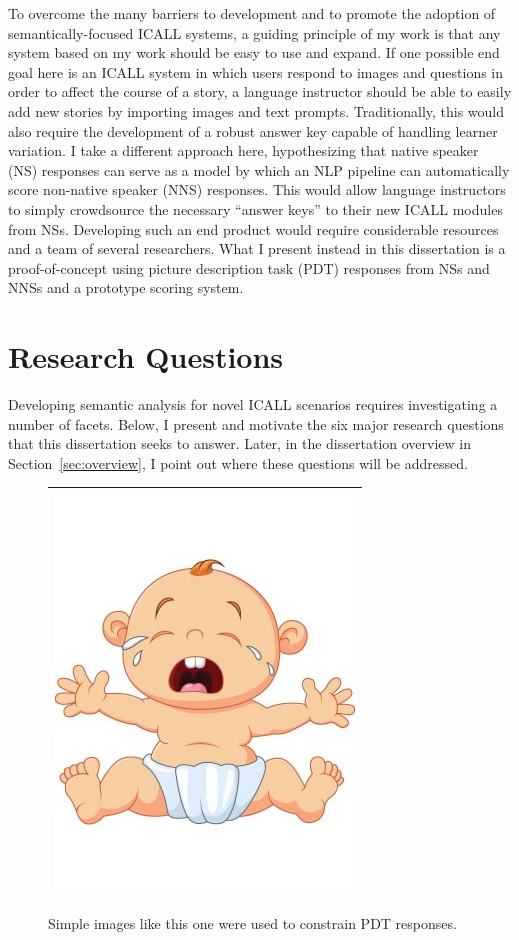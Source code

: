 To overcome the many barriers to development and to promote the adoption of se\-man\-tic\-ally-focused ICALL systems, a guiding principle of my work is that any system based on my work should be easy to use and expand. If one possible end goal here is an ICALL system
 in which users respond to images and questions in order to affect the course of a story, a language instructor should be able to easily add new stories by importing images and text prompts. Traditionally, this would also require the development of a robust answer key capable of handling learner variation. I take a different approach here, hypothesizing that native speaker (NS) responses can serve as a model by which an NLP pipeline can automatically score non-native speaker (NNS) responses. This would allow language instructors to simply crowdsource the necessary ``answer keys'' to their new ICALL modules from NSs. Developing such an end product would require considerable resources and a team of several researchers. What I present instead in this dissertation is a proof-of-concept using picture description task (PDT) responses from NSs and NNSs and a prototype scoring system.


\section{Research Questions}
\label{sec:RQ}
Developing semantic analysis for novel ICALL scenarios requires investigating a number of facets. Below, I present and motivate the six major research questions that this dissertation seeks to answer. Later, in the dissertation overview in Section~\ref{sec:overview}, I point out where these questions will be addressed.

\begin{figure}[htb!]
\begin{center}
\begin{tabular}{|c|}
\hline
\includegraphics[width=0.3\columnwidth]{figures/I10.jpg} \\
\hline
\end{tabular}
\end{center}
\caption{Simple images like this one were used to constrain PDT responses.}
\label{fig:intro-image}
\end{figure}


